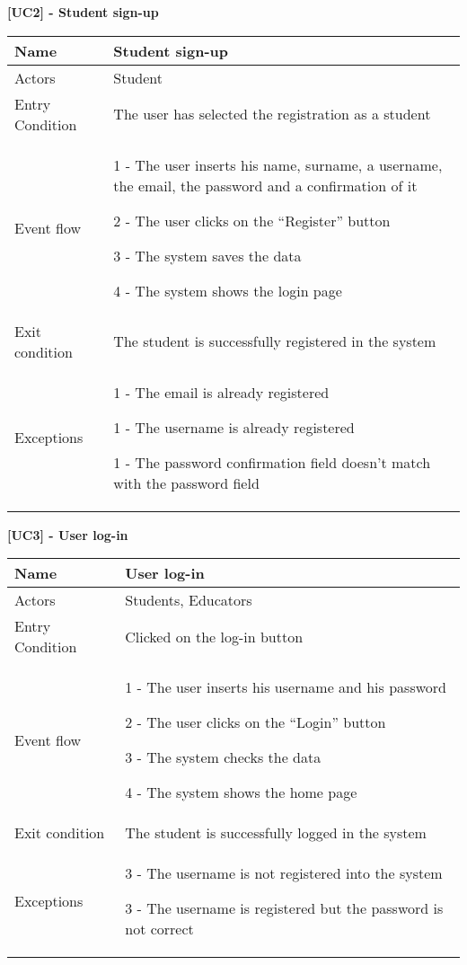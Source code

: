     \begin{table}[h]
    \textbf{[UC2] - Student sign-up}
    
      \centering
      \begin{tabular}{|p{3cm}|p{14cm}|}
        \hline
         Name & Student sign-up \\
        \hline
        Actors & Student \\
        \hline
        Entry Condition & The user has selected the registration as a student \\
        \hline
        Event flow &  1 - The user inserts his name, surname, a username, the email,
        the password and a confirmation of it 
        
        2 - The user clicks on the ``Register'' button

        3 - The system saves the data

        4 - The system shows the login page
        \\
        \hline
        Exit condition & The student is successfully registered in the system \\
        \hline
        Exceptions & 1 - The email is already registered
        
        1 - The username is already registered 
        
        1 - The password confirmation field doesn't match with the password field\\
        \hline
      \end{tabular}
      
    \end{table}

    \begin{table}[]
    \textbf{[UC3] - User log-in}
    
      \centering
      \begin{tabular}{|p{3cm}|p{14cm}|}
        \hline
         Name & User log-in \\
        \hline
        Actors & Students, Educators \\
        \hline
        Entry Condition & Clicked on the log-in button \\
        \hline
        Event flow &  1 - The user inserts his username and his password
        
        2 - The user clicks on the ``Login'' button

        3 - The system checks the data

        4 - The system shows the home page
        \\
        \hline
        Exit condition & The student is successfully logged in the system \\
        \hline
        Exceptions & 3 - The username is not registered into the system
        
        3 - The username is registered but the password is not correct 
        \\
        \hline
      \end{tabular}
      
    \end{table}

